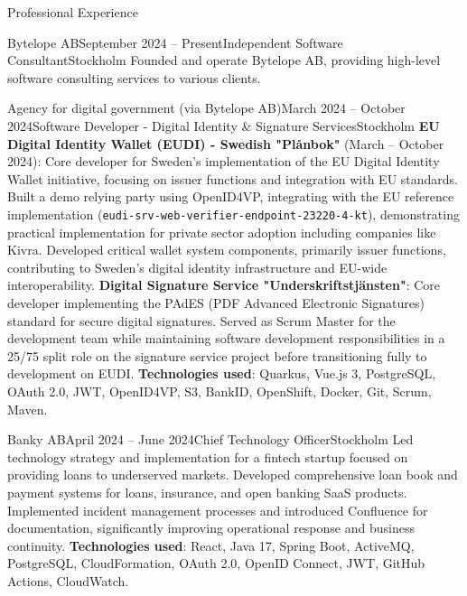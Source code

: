 \documentclass{resume}
\begin{document}
\begin{rSection}{Professional Experience}

\begin{rSubsection}{Bytelope AB}{September 2024 -- Present}{Independent Software Consultant}{Stockholm}
\bItem Founded and operate Bytelope AB, providing high-level software consulting services to various clients.
\end{rSubsection}

\begin{rClientSubsection}{Agency for digital government (via Bytelope AB)}{March 2024 -- October 2024}{Software Developer - Digital Identity \& Signature Services}{Stockholm} %
\bItem \textbf{EU Digital Identity Wallet (EUDI) - Swedish "Plånbok"} (March -- October 2024): Core developer for Sweden's implementation of the EU Digital Identity Wallet initiative, focusing on issuer functions and integration with EU standards.
\bItem Built a demo relying party using OpenID4VP, integrating with the EU reference implementation (\texttt{eudi-srv-web-verifier-endpoint-23220-4-kt}), demonstrating practical implementation for private sector adoption including companies like Kivra.
\bItem Developed critical wallet system components, primarily issuer functions, contributing to Sweden's digital identity infrastructure and EU-wide interoperability.
\bItem \textbf{Digital Signature Service "Underskriftstjänsten"}: Core developer implementing the PAdES (PDF Advanced Electronic Signatures) standard for secure digital signatures.
\bItem Served as Scrum Master for the development team while maintaining software development responsibilities in a 25/75 split role on the signature service project before transitioning fully to development on EUDI.
\bItem \textbf{Technologies used}: Quarkus, Vue.js 3, PostgreSQL, OAuth 2.0, JWT, OpenID4VP, S3, BankID, OpenShift, Docker, Git, Scrum, Maven.
\end{rClientSubsection}

\begin{rSubsection}{Banky AB}{April 2024 -- June 2024}{Chief Technology Officer}{Stockholm}
\bItem Led technology strategy and implementation for a fintech startup focused on providing loans to underserved markets.
\bItem Developed comprehensive loan book and payment systems for loans, insurance, and open banking SaaS products.
\bItem Implemented incident management processes and introduced Confluence for documentation, significantly improving operational response and business continuity.
\bItem \textbf{Technologies used}: React, Java 17, Spring Boot, ActiveMQ, PostgreSQL, CloudFormation, OAuth 2.0, OpenID Connect, JWT, GitHub Actions, CloudWatch.
\end{rSubsection}


\end{rSection}
\end{document}
